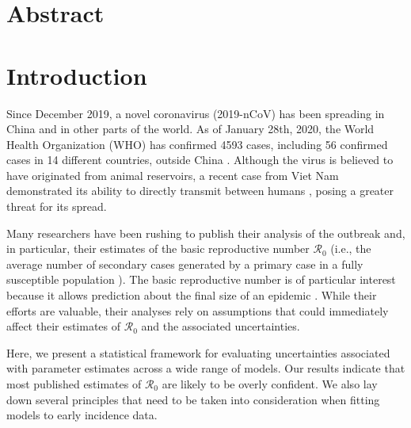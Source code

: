 \documentclass[12pt]{article}
\date{\today}
\begin{document}
\begin{flushleft}{
	\Large
	\textbf{}
}

\bigskip

\end{flushleft}

\section*{Abstract}

\pagebreak

\section{Introduction}

Since December 2019, a novel coronavirus (2019-nCoV) has been
spreading in China and in other parts of the world.
As of January 28th, 2020, the World Health Organization (WHO) has
confirmed 4593 cases, including 56 confirmed cases in 14 different
countries, outside China \citep{who28report}.
Although the virus is believed to have originated
from animal reservoirs, a recent case from Viet Nam
demonstrated its ability to directly transmit between
humans \citep{who26report},
posing a greater threat for its spread.

Many researchers have been rushing to publish their 
analysis of the outbreak and, in particular, their
estimates of the basic reproductive number $\mathcal R_0$ (i.e., the 
average number of secondary cases generated 
by a primary case in a fully susceptible population \citep{anderson1991infectious, diekmann1990definition}).
The basic reproductive number is of particular interest 
because it allows prediction about the final size of an epidemic \citep{anderson1991infectious, ma2006generality, arino2007final, andreasen2011final, miller2012note}.
While their efforts are valuable, their analyses rely on
assumptions that could immediately affect their estimates of $\mathcal R_0$ and
the associated uncertainties.

Here, we present a statistical framework for evaluating uncertainties 
associated with parameter estimates
across a wide range of models.
Our results indicate that most published estimates of $\mathcal R_0$
are likely to be overly confident.
We also lay down several principles that need to be taken into
consideration when fitting models to early incidence data.
\end{document}
